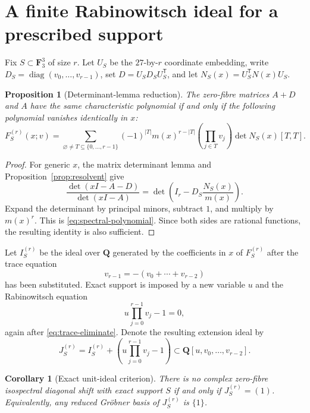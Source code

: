 \documentclass[11pt,reqno]{amsart}
\newtheorem{proposition}[theorem]{Proposition}
\newtheorem{corollary}[theorem]{Corollary}
\theoremstyle{definition}
\theoremstyle{remark}
\newcommand{\F}{\mathbf F}
\newcommand{\Q}{\mathbf Q}
\begin{document}
\section{A finite Rabinowitsch ideal for a prescribed support}

Fix $S\subset\F_3^3$ of size $r$.  Let $U_S$ be the $27$-by-$r$ coordinate
embedding, write $D_S=\operatorname{diag}(v_0,\ldots,v_{r-1})$, set
$D=U_SD_SU_S^{\mathsf T}$, and let $N_S(x)=U_S^{\mathsf T}N(x)U_S$.

\begin{proposition}[Determinant-lemma reduction]\label{prop:detlemma}
The zero-fibre matrices $A+D$ and $A$ have the same characteristic
polynomial if and only if the following polynomial vanishes identically in
$x$:
\begin{equation}\label{eq:spectral-polynomial}
 F_S^{(r)}(x;v)=
 \sum_{\varnothing\neq T\subseteq\{0,\ldots,r-1\}}
 (-1)^{|T|}m(x)^{r-|T|}
 \left(\prod_{j\in T}v_j\right)
 \det N_S(x)[T,T].
\end{equation}
\end{proposition}

\begin{proof}
For generic $x$, the matrix determinant lemma and
Proposition~\ref{prop:resolvent} give
\[
 \frac{\det(xI-A-D)}{\det(xI-A)}
 =\det\left(I_r-D_S\frac{N_S(x)}{m(x)}\right).
\]
Expand the determinant by principal minors, subtract $1$, and multiply by
$m(x)^r$.  This is \eqref{eq:spectral-polynomial}.  Since both sides are
rational functions, the resulting identity is also sufficient.
\end{proof}

Let $I_S^{(r)}$ be the ideal over $\Q$ generated by the coefficients in $x$
of $F_S^{(r)}$ after the trace equation
\begin{equation}\label{eq:trace-eliminate}
 v_{r-1}=-(v_0+\cdots+v_{r-2})
\end{equation}
has been substituted.  Exact support is imposed by a new variable $u$ and
the Rabinowitsch equation
\begin{equation}\label{eq:rabinowitsch}
 u\prod_{j=0}^{r-1}v_j-1=0,
\end{equation}
again after \eqref{eq:trace-eliminate}.  Denote the resulting extension ideal
by
\begin{equation}\label{eq:extension-ideal}
 J_S^{(r)}=
 I_S^{(r)}+\left(u\prod_{j=0}^{r-1}v_j-1\right)
 \subset\Q[u,v_0,\ldots,v_{r-2}].
\end{equation}

\begin{corollary}[Exact unit-ideal criterion]\label{cor:unit}
There is no complex zero-fibre isospectral diagonal shift with exact support
$S$ if and only if $J_S^{(r)}=(1)$.  Equivalently, any reduced
Gr\"obner basis of $J_S^{(r)}$ is $\{1\}$.
\end{corollary}
\end{document}

